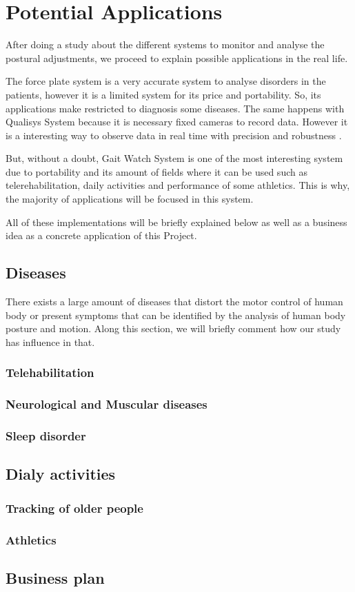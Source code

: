 \chapter{Potential Applications}
\label{ch:Applications}

After doing a study about the different systems to monitor and analyse the postural adjustments, we proceed to explain possible applications in the real life.

The force plate system is a very accurate system to analyse disorders in the patients, however it is a limited system for its price and portability. So, its applications make restricted to diagnosis some diseases.
The same happens with Qualisys System because it is necessary fixed cameras to record data. However it is a interesting way to observe data in real time with precision and robustness .

But, without a doubt, Gait Watch System is one of the most interesting system due to portability and its amount of fields where it can be used such as telerehabilitation, daily activities and performance of some athletics. This is why, the majority of applications will be focused in this system.

All of these implementations will be briefly explained below as well as a business idea as a concrete application of this Project.

\section{Diseases}
There exists a large amount of diseases that distort the motor control of human body or present symptoms that can be identified by the analysis of human body posture and motion. Along this section,  we will briefly comment how our study has influence in that.

\subsection{Telehabilitation}
\subsection{Neurological and Muscular diseases}
\subsection{Sleep disorder}

\section{Dialy activities }

\subsection{Tracking of older people}
\subsection{Athletics}

\section{Business plan }